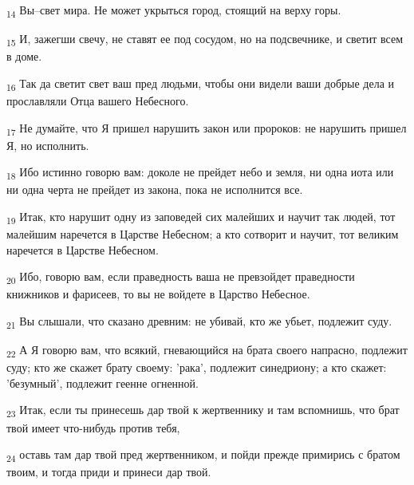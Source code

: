 \begin{tcolorbox}
\textsubscript{14} Вы--свет мира. Не может укрыться город, стоящий на верху горы.
\end{tcolorbox}
\begin{tcolorbox}
\textsubscript{15} И, зажегши свечу, не ставят ее под сосудом, но на подсвечнике, и светит всем в доме.
\end{tcolorbox}
\begin{tcolorbox}
\textsubscript{16} Так да светит свет ваш пред людьми, чтобы они видели ваши добрые дела и прославляли Отца вашего Небесного.
\end{tcolorbox}
\begin{tcolorbox}
\textsubscript{17} Не думайте, что Я пришел нарушить закон или пророков: не нарушить пришел Я, но исполнить.
\end{tcolorbox}
\begin{tcolorbox}
\textsubscript{18} Ибо истинно говорю вам: доколе не прейдет небо и земля, ни одна иота или ни одна черта не прейдет из закона, пока не исполнится все.
\end{tcolorbox}
\begin{tcolorbox}
\textsubscript{19} Итак, кто нарушит одну из заповедей сих малейших и научит так людей, тот малейшим наречется в Царстве Небесном; а кто сотворит и научит, тот великим наречется в Царстве Небесном.
\end{tcolorbox}
\begin{tcolorbox}
\textsubscript{20} Ибо, говорю вам, если праведность ваша не превзойдет праведности книжников и фарисеев, то вы не войдете в Царство Небесное.
\end{tcolorbox}
\begin{tcolorbox}
\textsubscript{21} Вы слышали, что сказано древним: не убивай, кто же убьет, подлежит суду.
\end{tcolorbox}
\begin{tcolorbox}
\textsubscript{22} А Я говорю вам, что всякий, гневающийся на брата своего напрасно, подлежит суду; кто же скажет брату своему: 'рака', подлежит синедриону; а кто скажет: 'безумный', подлежит геенне огненной.
\end{tcolorbox}
\begin{tcolorbox}
\textsubscript{23} Итак, если ты принесешь дар твой к жертвеннику и там вспомнишь, что брат твой имеет что-нибудь против тебя,
\end{tcolorbox}
\begin{tcolorbox}
\textsubscript{24} оставь там дар твой пред жертвенником, и пойди прежде примирись с братом твоим, и тогда приди и принеси дар твой.
\end{tcolorbox}
